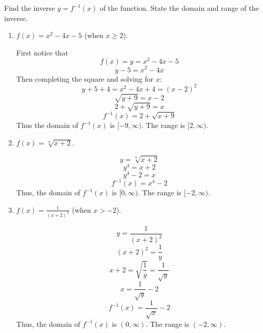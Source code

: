 \documentclass[handout,nooutcomes]{ximera}
\begin{document}
\begin{problem}			
				
Find the inverse $y=f^{-1}(x)$ of the function.  State the domain and range of the inverse.
	
			\begin{enumerate}
			\item  $f(x)=x^2-4x-5$ (when $x\geq2$).
			
			 \begin{freeResponse}
			 First notice that			 
			 $$f(x)= y =x^2-4x-5 $$
			$$y-5=x^2-4x $$
			Then completing the square and solving for $x$:
			$$y+5+4=x^2-4x+4 = (x-2)^2$$
			$$ \sqrt{y+9}=x-2$$
			$$2+\sqrt{y+9}=x$$
			$$f^{-1}(x) = 2 + \sqrt{x + 9}$$
			Thus the domain of $f^{-1}(x)$ is $[-9,\infty )$.  The range is $[2,\infty )$.
			 \end{freeResponse}
			 
			\item  $f(x)=\sqrt[4]{x+2}$.
			
			 \begin{freeResponse}			 
			 $$y=\sqrt[4]{x+2}$$
			$$y^4 = x + 2$$
			$$y^4 - 2 = x$$
			$$f^{-1}(x) = x^4 - 2$$
			Thus, the domain of $f^{-1}(x)$ is $[0, \infty )$.  The range is $[-2, \infty )$.  
			 \end{freeResponse}
			 
			\item  $f(x)=\frac{1}{(x+2)^2}$  (when $x>-2$).
			
			 \begin{freeResponse}			 
			 $$y = \frac{1}{(x+2)^2}$$
			$$(x+2)^2 = \frac{1}{y}$$
			$$ x+2 = \sqrt{\frac{1}{y}} = \frac{1}{\sqrt{y}}$$
			$$x = \frac{1}{\sqrt{y}} - 2 $$
			$$f^{-1}(x) = \frac{1}{\sqrt{x}} - 2$$
			Thus, the domain of $f^{-1}(x)$ is $(0, \infty)$.  The range is $(-2, \infty )$. 
			 \end{freeResponse}
			 
			\end{enumerate}
			
\end{problem}
	
	
	
\end{document}
